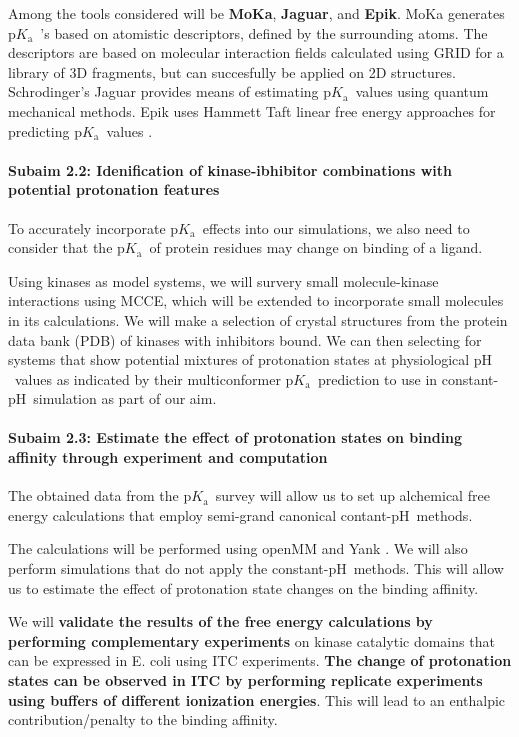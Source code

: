 \documentclass[10pt,final]{article}
\newcommand{\subsubsubsection}[1]{\paragraph*{#1}}
\newcommand{\pKa}{$\mathrm{p}K_\mathrm{a}$\ }
\newcommand{\pH}{$\mathrm{pH}$\ }
\begin{document}
\todo[inline,color=blue!40]{summary of available \pKa prediction tools.}
Among the tools considered will be \textbf{MoKa}\cite{Milletti2007a}, \textbf{Jaguar}\cite{Bochevarov2013a}, and \textbf{Epik}\cite{Shelley2007a,Greenwood2010a}.
MoKa generates \pKa's based on atomistic descriptors, defined by the surrounding atoms. The descriptors are based on molecular interaction fields calculated using GRID \cite{Goodford1985a} for a library of 3D fragments, but can succesfully be applied on 2D structures.
Schrodinger's Jaguar provides means of estimating \pKa values using quantum mechanical methods.
Epik uses Hammett Taft linear free energy approaches\cite{Perrin1981a} for predicting \pKa values .

\subsubsubsection{Subaim 2.2: Idenification of kinase-ibhibitor combinations with potential protonation features}
To accurately incorporate \pKa effects into our simulations, we also need to consider that the \pKa of protein residues may change on binding of a ligand. 

Using kinases as model systems, we will survery small molecule-kinase interactions using MCCE\cite{Song2009a}, which will be extended to incorporate small molecules in its calculations.
We will make a selection of crystal structures from the protein data bank (PDB)\cite{Berman2000a} of kinases with inhibitors bound. 
We can then selecting for systems that show potential mixtures of protonation states at physiological \pH values as indicated by their multiconformer \pKa prediction to use in constant-\pH simulation as part of our aim. 


\subsubsubsection{Subaim 2.3: Estimate the effect of protonation states on binding affinity through experiment and computation}
The obtained data from the \pKa survey will allow us to set up alchemical free energy calculations that employ semi-grand canonical contant-\pH methods.\cite{Mongan2004a}

The calculations will be performed using openMM\cite{Eastman2013a} and Yank \cite{Chodera2015a}. We will also perform simulations that do not apply the constant-\pH methods. This will allow us to estimate the effect of protonation state changes on the binding affinity.

We will \textbf{validate the results of the free energy calculations by performing complementary experiments} on kinase catalytic domains that can be expressed in E. coli using ITC experiments. \textbf{The change of protonation states can be observed in ITC by performing replicate experiments using buffers of different ionization energies}. This will lead to an enthalpic contribution/penalty to the binding affinity.
\end{document}
